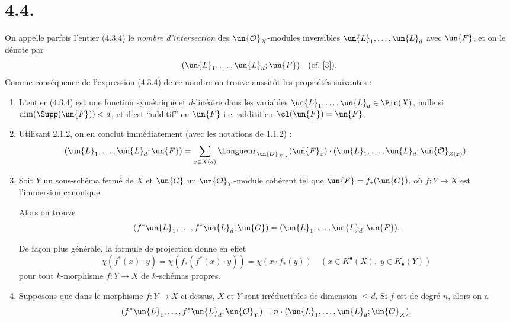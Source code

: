 \section*{4.4.}

On appelle parfois l'entier (4.3.4) le \emph{nombre d'intersection} des $\un{\mathcal{O}}_{X}$-modules inversibles $\un{L}_{1}, \dots, \un{L}_{d}$ avec $\un{F}$, et on le d\'enote par
\[
(\un{L}_{1}, \dots, \un{L}_{d}; \un{F}) \quad (\text{cf.\ } [3]).
\]
Comme cons\'equence de l'expression (4.3.4) de ce nombre on trouve aussit\^ot les propri\'et\'es suivantes :

\begin{enumerate}
\item L'entier (4.3.4) est une fonction sym\'etrique et $d$-lin\'eaire dans les variables $\un{L}_{1}, \dots, \un{L}_{d} \in \Pic(X)$, nulle si $\dim(\Supp(\un{F})) < d$, et il est ``additif'' en $\un{F}$ i.e.\ additif en $\cl(\un{F}) = \un{F}$.

\item Utilisant 2.1.2, on en conclut imm\'ediatement (avec les notations de 1.1.2) :
\begin{equation}\label{eq:4.4.1}
(\un{L}_{1}, \dots, \un{L}_{d}; \un{F}) = \sum_{x \in X(d)} \longueur_{\un{\mathcal{O}}_{X,x}}(\un{F}_{x}) \cdot (\un{L}_{1}, \dots, \un{L}_{d}; \un{\mathcal{O}}_{Z(x)}).
\end{equation}

\item Soit $Y$ un sous-sch\'ema ferm\'e de $X$ et $\un{G}$ un $\un{\mathcal{O}}_{Y}$-module coh\'erent tel que $\un{F} = f_{*}(\un{G})$, o\`u $f : Y \to X$ est l'immersion canonique.

Alors on trouve
\[
(f^{*}\un{L}_{1}, \dots, f^{*}\un{L}_{d}; \un{G}) = (\un{L}_{1}, \dots, \un{L}_{d}; \un{F}).
\]

De fa\c con plus g\'en\'erale, la formule de projection donne en effet
\begin{equation}\label{eq:4.4.2}
\chi(f^{*}(x) \cdot y) = \chi(f_{*}(f^{*}(x) \cdot y)) = \chi(x \cdot f_{*}(y)) \quad (x \in K^{\bullet}(X), \; y \in K_{\bullet}(Y))
\end{equation}
pour tout $k$-morphisme $f : Y \to X$ de $k$-sch\'emas propres.

\item Supposons que dans le morphisme $f : Y \to X$ ci-dessus, $X$ et $Y$ sont irr\'eductibles de dimension $\leqslant d$. Si $f$ est de degr\'e $n$, alors on a
\begin{equation}\label{eq:4.4.3}
(f^{*}\un{L}_{1}, \dots, f^{*}\un{L}_{d}; \un{\mathcal{O}}_{Y}) = n \cdot (\un{L}_{1}, \dots, \un{L}_{d}; \un{\mathcal{O}}_{X}).
\end{equation}
\end{enumerate}

